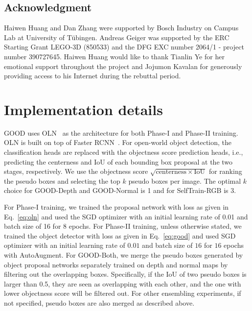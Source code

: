 \documentclass{article} \usepackage{iclr2023_conference,times}
\begin{document}
\subsection*{Acknowledgment}
Haiwen Huang and Dan Zhang were supported by Bosch Industry on Campus Lab at University of Tübingen. Andreas Geiger was supported by the ERC Starting Grant LEGO-3D (850533) and the DFG EXC number 2064/1 - project number 390727645. Haiwen Huang would like to thank Tianlin Ye for her emotional support throughout the project and Jojumon Kavalan for generously providing access to his Internet during the rebuttal period. 




\newpage


\appendix



\section{Implementation details}\label{appendix: implementation}

GOOD uses OLN~\citep{kim_learning_2021} as the architecture for both Phase-I and Phase-II training. OLN is built on top of Faster RCNN~\citep{ren_faster_2015}.
For open-world object detection, the classification heads are replaced with the objectness score prediction heads, i.e., predicting the centerness and IoU of each bounding box proposal at the two stages, respectively. We use the objectness score $\sqrt{\mathrm{centerness}\times\mathrm{IoU}}$ for ranking the pseudo boxes and selecting the top $k$ pseudo boxes per image.
The optimal $k$ choice for GOOD-Depth and GOOD-Normal is 1 and for SelfTrain-RGB is 3.

For Phase-I training, we trained the proposal network with loss as given in Eq.~\ref{eq:oln} and used the SGD optimizer with an initial learning rate of 0.01 and batch size of 16 for 8 epochs. 
For Phase-II training, unless otherwise stated, we trained the object detector with loss as given in Eq.~\ref{eq:good} and used SGD optimizer with an initial learning rate of $0.01$ and batch size of $16$ for $16$ epochs with AutoAugment.
For GOOD-Both, we merge the pseudo boxes generated by object proposal networks separately trained on depth and normal maps by filtering out the overlapping boxes. Specifically, if the IoU of two pseudo boxes is larger than 0.5, they are seen as overlapping with each other, and the one with lower objectness score will be filtered out. For other ensembling  experiments, if not specified, pseudo boxes are also merged as described above.
\end{document}
